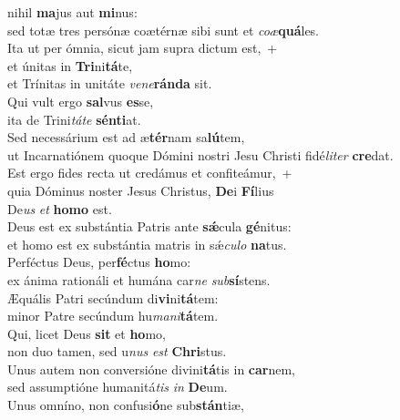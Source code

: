 \evenverse  nihil \textbf{ma}jus aut \textbf{mi}nus:~\*\\
\evenverse sed totæ tres persónæ coætérnæ sibi sunt et \textit{co}\textit{æ}\textbf{quá}les.\\
\oddverse Ita ut per ómnia, sicut jam supra dictum est,~+\\
\oddverse  et únitas in \textbf{Tri}ni\textbf{tá}te,~\*\\
\oddverse et Trínitas in unitáte \textit{ve}\textit{ne}\textbf{rán}\textbf{da} sit.\\
\evenverse Qui vult ergo \textbf{sal}vus \textbf{es}se,~\*\\
\evenverse ita de Trini\textit{tá}\textit{te} \textbf{sén}\textbf{ti}at.\\
\oddverse Sed necessárium est ad æ\textbf{tér}nam sa\textbf{lú}tem,~\*\\
\oddverse ut Incarnatiónem quoque Dómini nostri Jesu Christi fidé\textit{li}\textit{ter} \textbf{cre}dat.\\
\evenverse Est ergo fides recta ut credámus et confiteámur,~+\\
\evenverse  quia Dóminus noster Jesus Christus, \textbf{De}i \textbf{Fí}lius~\*\\
\evenverse De\textit{us} \textit{et} \textbf{ho}\textbf{mo} est.\\
\oddverse Deus est ex substántia Patris ante \textbf{sǽ}cula \textbf{gé}nitus:~\*\\
\oddverse et homo est ex substántia matris in sǽ\textit{cu}\textit{lo} \textbf{na}tus.\\
\evenverse Perféctus Deus, per\textbf{fé}ctus \textbf{ho}mo:~\*\\
\evenverse ex ánima rationáli et humána car\textit{ne} \textit{sub}\textbf{sí}stens.\\
\oddverse Æquális Patri secúndum di\textbf{vi}ni\textbf{tá}tem:~\*\\
\oddverse minor Patre secúndum hu\textit{ma}\textit{ni}\textbf{tá}tem.\\
\evenverse Qui, licet Deus \textbf{sit} et \textbf{ho}mo,~\*\\
\evenverse non duo tamen, sed u\textit{nus} \textit{est} \textbf{Chri}stus.\\
\oddverse Unus autem non conversióne divini\textbf{tá}tis in \textbf{car}nem,~\*\\
\oddverse sed assumptióne humanitá\textit{tis} \textit{in} \textbf{De}um.\\
\evenverse Unus omníno, non confusi\textbf{ó}ne sub\textbf{stán}tiæ,~\*\\
